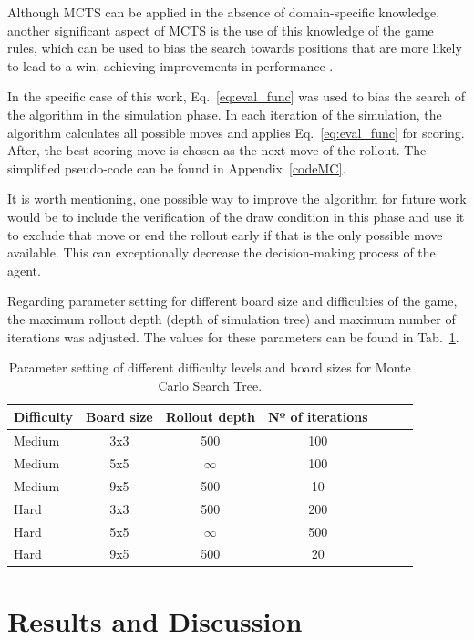 \documentclass[journal]{IEEEtran}
\begin{document}
Although MCTS can be applied in the absence of domain-specific knowledge, another significant aspect of MCTS is the use of this knowledge of the game rules, which can be used to bias the search towards positions that are more likely to lead to a win, achieving improvements in performance \cite{Browne2012}. 

In the specific case of this work, Eq.~\ref{eq:eval_func} was used to bias the search of the algorithm in the simulation phase. In each iteration of the simulation, the algorithm calculates all possible moves and applies Eq.~\ref{eq:eval_func} for scoring. After, the best scoring move is chosen as the next move of the rollout. The simplified pseudo-code can be found in Appendix~\ref{codeMC}.

It is worth mentioning, one possible way to improve the algorithm for future work would be to include the verification of the draw condition in this phase and use it to exclude that move or end the rollout early if that is the only possible move available. This can exceptionally decrease the decision-making process of the agent.

Regarding parameter setting for different board size and difficulties of the game, the maximum rollout depth (depth of simulation tree) and maximum number of iterations was adjusted. The values for these parameters can be found in Tab.~\ref{tab:MCTS_details}.

\begin{table}[h]
    \caption{Parameter setting of different difficulty levels and board sizes for Monte Carlo Search Tree.}
    \centering
    \label{tab:MCTS_details}
        \begin{tabular}{l c c c c c c}
        \hline
        Difficulty & Board size & Rollout depth & Nº of iterations \\
        \hline
        Medium & 3x3 & 500 & 100\\
        Medium & 5x5 & $\infty$ & 100\\
        Medium & 9x5 & 500 & 10\\
        \addlinespace
        Hard & 3x3 & 500 & 200\\
        Hard & 5x5 & $\infty$ & 500 \\
        Hard & 9x5 & 500 & 20\\
        \hline
        \end{tabular}
\end{table}

\section{Results and Discussion}
\end{document}

